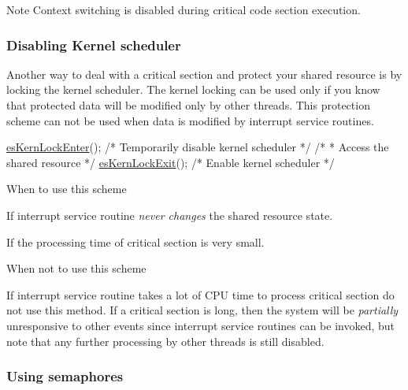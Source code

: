 \begin{DoxyNote}{Note}
Context switching is disabled during critical code section execution.
\end{DoxyNote}
\hypertarget{critical_section_cs_kernel_lock}{}\subsubsection{Disabling Kernel scheduler}\label{critical_section_cs_kernel_lock}
Another way to deal with a critical section and protect your shared resource is by locking the kernel scheduler. The kernel locking can be used only if you know that protected data will be modified only by other threads. This protection scheme can not be used when data is modified by interrupt service routines.


\begin{DoxyCode}
\hyperlink{group__kern__lock_ga86ec4f4cbaa889b0f23c7e2ebdcbbb97}{esKernLockEnter}();                  \textcolor{comment}{/* Temporarily disable kernel scheduler  */}
\textcolor{comment}{/*}
\textcolor{comment}{ * Access the shared resource}
\textcolor{comment}{ */}
\hyperlink{group__kern__lock_gaf1eec663f7cc5c414b113901382ccd82}{esKernLockExit}();                   \textcolor{comment}{/* Enable kernel scheduler */}
\end{DoxyCode}
 \begin{DoxyParagraph}{When to use this scheme}

\begin{DoxyItemize}
\item If interrupt service routine {\itshape never changes} the shared resource state.
\item If the processing time of critical section is very small.
\end{DoxyItemize}
\end{DoxyParagraph}
\begin{DoxyParagraph}{When not to use this scheme}

\begin{DoxyItemize}
\item If interrupt service routine takes a lot of C\-P\-U time to process critical section do not use this method. If a critical section is long, then the system will be {\itshape partially} unresponsive to other events since interrupt service routines can be invoked, but note that any further processing by other threads is still disabled.
\end{DoxyItemize}
\end{DoxyParagraph}
\hypertarget{critical_section_cs_sem_lock}{}\subsubsection{Using semaphores}\label{critical_section_cs_sem_lock}
